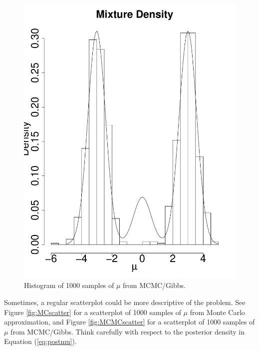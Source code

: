 \documentclass[11pt]{article}
\begin{document}
\begin{enumerate}
\begin{itemize}
\begin{multicols}{2}
\begin{figure}[H]
\begin{center}
\includegraphics[scale=0.3]{figures/MCMCdensity}
\caption{\label{fig:MCMCdensity} Histogram of 1000 samples of $\mu$ from MCMC/Gibbs.}
\end{center}
\end{figure}

\end{multicols}

Sometimes, a regular scatterplot could be more descriptive of the problem. See Figure \ref{fig:MCscatter} for a scatterplot of 1000 samples of $\mu$ from Monte Carlo approximation, and Figure \ref{fig:MCMCscatter} for a scatterplot of 1000 samples of $\mu$ from MCMC/Gibbs. Think carefully with respect to the posterior density in Equation (\ref{eq:postmu}).


\end{itemize}
\end{enumerate}
\end{document}
